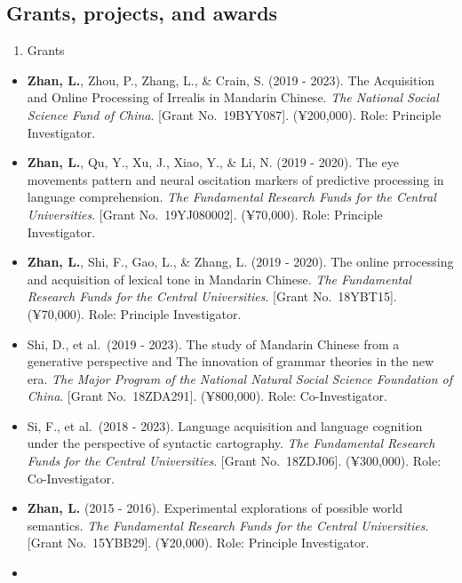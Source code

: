 \documentclass[12pt,]{article}
\providecommand{\tightlist}{%
  \setlength{\itemsep}{0pt}\setlength{\parskip}{0pt}}
\begin{document}
\hypertarget{grants-projects-and-awards}{%
\subsection{Grants, projects, and
awards}\label{grants-projects-and-awards}}

\begin{enumerate}
\def\labelenumi{\arabic{enumi}.}
\tightlist
\item
  Grants
\end{enumerate}

\begin{itemize}
\item
  \textbf{Zhan, L.}, Zhou, P., Zhang, L., \& Crain, S. (2019 - 2023).
  The Acquisition and Online Processing of Irrealis in Mandarin Chinese.
  \emph{The National Social Science Fund of China}. {[}Grant
  No.~19BYY087{]}. (¥200,000). Role: Principle Investigator.
\item
  \textbf{Zhan, L.}, Qu, Y., Xu, J., Xiao, Y., \& Li, N. (2019 - 2020).
  The eye movements pattern and neural oscitation markers of predictive
  processing in language comprehension. \emph{The Fundamental Research
  Funds for the Central Universities}. {[}Grant No.~19YJ080002{]}.
  (¥70,000). Role: Principle Investigator.
\item
  \textbf{Zhan, L.}, Shi, F., Gao, L., \& Zhang, L. (2019 - 2020). The
  online prrocessing and acquisition of lexical tone in Mandarin
  Chinese. \emph{The Fundamental Research Funds for the Central
  Universities}. {[}Grant No.~18YBT15{]}. (¥70,000). Role: Principle
  Investigator.
\item
  Shi, D., et al.~(2019 - 2023). The study of Mandarin Chinese from a
  generative perspective and The innovation of grammar theories in the
  new era. \emph{The Major Program of the National Natural Social
  Science Foundation of China}. {[}Grant No.~18ZDA291{]}. (¥800,000).
  Role: Co-Investigator.
\item
  Si, F., et al.~(2018 - 2023). Language acquisition and language
  cognition under the perspective of syntactic cartography. \emph{The
  Fundamental Research Funds for the Central Universities}. {[}Grant
  No.~18ZDJ06{]}. (¥300,000). Role: Co-Investigator.
\item
  \textbf{Zhan, L.} (2015 - 2016). Experimental explorations of possible
  world semantics. \emph{The Fundamental Research Funds for the Central
  Universities}. {[}Grant No.~15YBB29{]}. (¥20,000). Role: Principle
  Investigator.
\item

\end{itemize}
\end{document}
